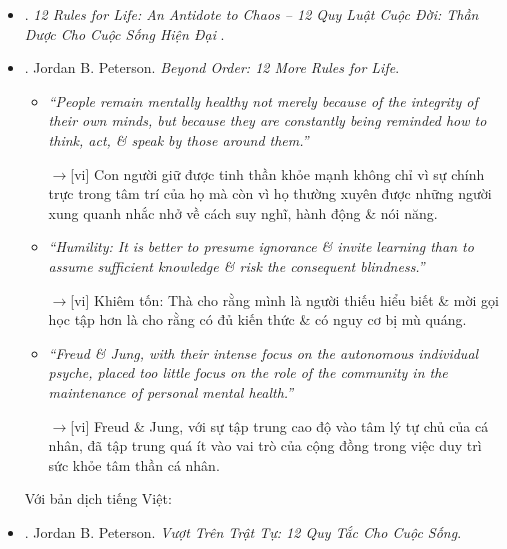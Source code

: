 \documentclass[12pt,twoside]{book}
\begin{document}
\begin{itemize}
\begin{itemize}
		{\sf[en]$\to$[vi]} Bởi vì chúng thực sự là những quy tắc. \& nguyên tắc quan trọng nhất là bạn phải chịu trách nhiệm về cuộc sống của chính mình. Chấm hết.
	\end{itemize}
	Với bản dịch tiếng Việt:
	\item \cite{Peterson_rule_VN}. {\it 12 Rules for Life: An Antidote to Chaos -- 12 Quy Luật Cuộc Đời: Thần Dược Cho Cuộc Sống Hiện Đại} .
	\item \cite{Peterson_beyond_order}. {\sc Jordan B. Peterson}. {\it Beyond Order: 12 More Rules for Life}.
	\begin{itemize}
		\item {\it``People remain mentally healthy not merely because of the integrity of their own minds, but because they are constantly being reminded how to think, act, \& speak by those around them.''}
		
		{\sf[en]$\to$[vi]} Con người giữ được tinh thần khỏe mạnh không chỉ vì sự chính trực trong tâm trí của họ mà còn vì họ thường xuyên được những người xung quanh nhắc nhở về cách suy nghĩ, hành động \& nói năng.
		
		\item {\it``Humility: It is better to presume ignorance \& invite learning than to assume sufficient knowledge \& risk the consequent blindness.''}
		
		{\sf[en]$\to$[vi]} Khiêm tốn: Thà cho rằng mình là người thiếu hiểu biết \& mời gọi học tập hơn là cho rằng có đủ kiến thức \& có nguy cơ bị mù quáng.
		
		\item {\it``{\sc Freud} \& {\sc Jung}, with their intense focus on the autonomous individual psyche, placed too little focus on the role of the community in the maintenance of personal mental health.''}
		
		{\sf[en]$\to$[vi]} {\sc Freud} \& {\sc Jung}, với sự tập trung cao độ vào tâm lý tự chủ của cá nhân, đã tập trung quá ít vào vai trò của cộng đồng trong việc duy trì sức khỏe tâm thần cá nhân.
	\end{itemize}
	Với bản dịch tiếng Việt:
	\item \cite{Peterson_beyond_order_VN}. {\sc Jordan B. Peterson}. {\it Vượt Trên Trật Tự: 12 Quy Tắc Cho Cuộc Sống}.
\end{itemize}
\end{document}
